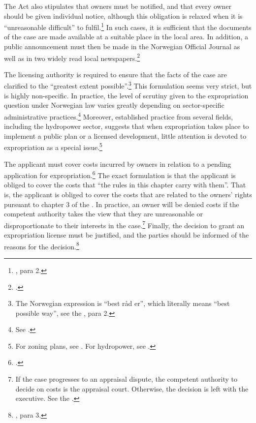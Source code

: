 The Act also stipulates that owners must be notified, and that every owner should be given individual notice, although this obligation is relaxed when it is ``unreasonable difficult'' to fulfil.\footnote{\dni\cite[12]{ea59}, para 2.} In such cases, it is sufficient that the documents of the case are made available at a suitable place in the local area. In addition, a public announcement must then be made in the Norwegian Official Journal as well as in two widely read local newspapers.\footnote{\dni\cite[12]{ea59}.}

The licensing authority is required to ensure that the facts of the case are clarified to the ``greatest extent possible''.\footnote{The Norwegian expression is ``best råd er'', which literally means ``best possible way'', see the \dni\cite[12]{ea59}, para 2.} This formulation seems very strict, but is highly non-specific. In practice, the level of scrutiny given to the expropriation question under Norwegian law varies greatly depending on sector-specific administrative practices.\footnote{See \cite[380-381]{dyrkolbotn15}.} Moreover, established practice from several fields, including the hydropower sector, suggests that when expropriation takes place to implement a public plan or a licensed development, little attention is devoted to expropriation as a special issue.\footnote{For zoning plans, see \cite{namsos98,bo99}. For hydropower, see \cite{jorpeland11}.}

The applicant must cover costs incurred by owners in relation to a pending application for expropriation.\footnote{\dni\cite[15]{ea59}.} The exact formulation is that the applicant is obliged to cover the costs that ``the rules in this chapter carry with them''. That is, the applicant is obliged to cover the costs that are related to the owners' rights pursuant to chapter 3 of the \cite{ea59}. In practice, an owner will be denied costs if the competent authority takes the view that they are unreasonable or disproportionate to their interests in the case.\footnote{If the case progresses to an appraisal dispute, the competent authority to decide on costs is the appraisal court. Otherwise, the decision is left with the executive. See the \dni\cite[15]{ea59}.} Finally, the decision to grant an expropriation license must be justified, and the parties should be informed of the reasons for the decision.\footnote{\dni\cite[12]{ea59}, para 3.}

